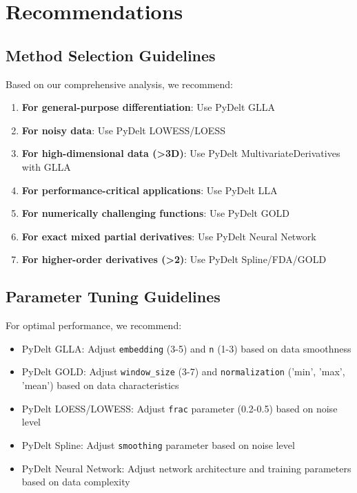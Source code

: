 \documentclass[10pt,journal,compsoc]{IEEEtran}
\begin{document}
\section{Recommendations}

\subsection{Method Selection Guidelines}

Based on our comprehensive analysis, we recommend:
\begin{enumerate}
    \item \textbf{For general-purpose differentiation}: Use PyDelt GLLA
    \item \textbf{For noisy data}: Use PyDelt LOWESS/LOESS
    \item \textbf{For high-dimensional data (>3D)}: Use PyDelt MultivariateDerivatives with GLLA
    \item \textbf{For performance-critical applications}: Use PyDelt LLA
    \item \textbf{For numerically challenging functions}: Use PyDelt GOLD
    \item \textbf{For exact mixed partial derivatives}: Use PyDelt Neural Network
    \item \textbf{For higher-order derivatives (>2)}: Use PyDelt Spline/FDA/GOLD
\end{enumerate}

\subsection{Parameter Tuning Guidelines}

For optimal performance, we recommend:
\begin{itemize}
    \item PyDelt GLLA: Adjust \texttt{embedding} (3-5) and \texttt{n} (1-3) based on data smoothness
    \item PyDelt GOLD: Adjust \texttt{window\_size} (3-7) and \texttt{normalization} ('min', 'max', 'mean') based on data characteristics
    \item PyDelt LOESS/LOWESS: Adjust \texttt{frac} parameter (0.2-0.5) based on noise level
    \item PyDelt Spline: Adjust \texttt{smoothing} parameter based on noise level
    \item PyDelt Neural Network: Adjust network architecture and training parameters based on data complexity
\end{itemize}
\end{document}
